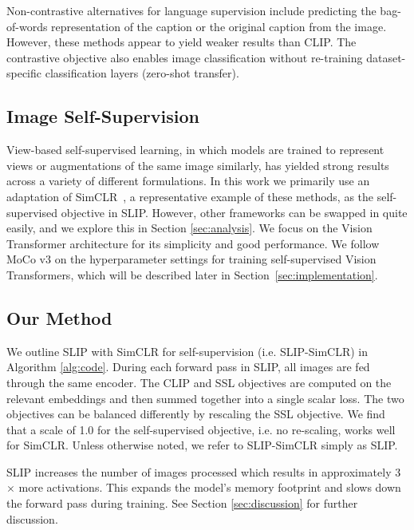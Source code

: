 \documentclass[10pt,twocolumn,letterpaper]{article}
\begin{document}
Non-contrastive alternatives for language supervision include predicting the bag-of-words representation of the caption \cite{Joulin2016LearningVF} or the original caption \cite{Sariyildiz2020LearningVR,Desai2021VirTexLV} from the image.
However, these methods appear to yield weaker results than CLIP.
The contrastive objective also enables image classification without re-training dataset-specific classification layers (zero-shot transfer).

\subsection{Image Self-Supervision}
\label{sec:slip_ssl}

View-based self-supervised learning, in which models are trained to represent views or augmentations of the same image similarly, has yielded strong results across a variety of different formulations.
In this work we primarily use an adaptation of SimCLR~\cite{Chen2020ASF,Chen2020BigSM}, a representative example of these methods, as the self-supervised objective in SLIP.
However, other frameworks can be swapped in quite easily, and we explore this in Section \ref{sec:analysis}.
We focus on the Vision Transformer \cite{Dosovitskiy2021AnII} architecture for its simplicity and good performance. We follow MoCo v3 \cite{Chen2021AnES} on the hyperparameter settings for training self-supervised Vision Transformers, which will be described later in Section~\ref{sec:implementation}.

\subsection{Our Method}
We outline SLIP with SimCLR for self-supervision (i.e. SLIP-SimCLR) in Algorithm \ref{alg:code}.
During each forward pass in SLIP, all images are fed through the same encoder.
The CLIP and SSL objectives are computed on the relevant embeddings and then summed together into a single scalar loss.
The two objectives can be balanced differently by rescaling the SSL objective.
We find that a scale of 1.0 for the self-supervised objective, i.e. no re-scaling, works well for SimCLR.
Unless otherwise noted, we refer to SLIP-SimCLR simply as SLIP.

SLIP increases the number of images processed which results in approximately 3$\times$ more activations.
This expands the model's memory footprint and slows down the forward pass during training.
See Section \ref{sec:discussion} for further discussion. 
\end{document}
